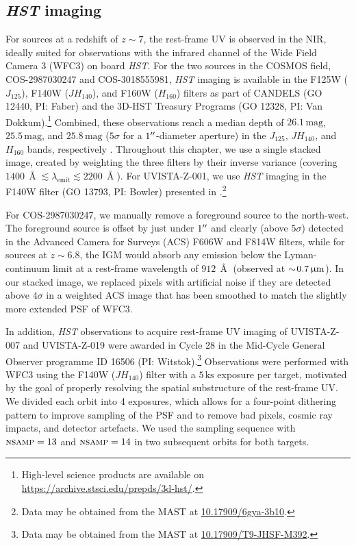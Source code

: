 \subsection{\textit{HST} imaging}
\label{chDssec:Observations:HST}

For sources at a redshift of $z \sim 7$, the rest-frame UV is observed in the NIR, ideally suited for observations with the infrared channel of the Wide Field Camera 3 (WFC3) on board \textit{HST}. For the two sources in the COSMOS field, COS-2987030247 and COS-3018555981, \textit{HST} imaging is available in the F125W ($J_{125}$), F140W ($JH_{140}$), and F160W ($H_{160}$) filters as part of CANDELS (GO 12440, PI: Faber) and the 3D-HST Treasury Programs (GO 12328, PI: Van Dokkum).\footnote{High-level science products are available on \url{https://archive.stsci.edu/prepds/3d-hst/}.} Combined, these observations reach a median depth of $26.1 \, \mathrm{mag}$, $25.5 \, \mathrm{mag}$, and $25.8 \, \mathrm{mag}$ ($5\sigma$ for a $1 \hbox{$^{\prime\prime}$}$-diameter aperture) in the $J_{125}$, $JH_{140}$, and $H_{160}$ bands, respectively \citep{2011ApJS..197...35G, 2011ApJS..197...36K, 2014ApJS..214...24S}. Throughout this chapter, we use a single stacked image, created by weighting the three filters by their inverse variance (covering $1400 \, \Angstrom \lesssim \lambda_\text{emit} \lesssim 2200 \, \Angstrom$). For UVISTA-Z-001, we use \textit{HST} imaging in the F140W filter (GO 13793, PI: Bowler) presented in \citet{2017MNRAS.466.3612B}.\footnote{Data may be obtained from the MAST at \href{https://dx.doi.org/10.17909/6gya-3b10}{10.17909/6gya-3b10}.}

For COS-2987030247, we manually remove a foreground source to the north-west. The foreground source is offset by just under $1 \hbox{$^{\prime\prime}$}$ and clearly (above $5 \sigma$) detected in the Advanced Camera for Surveys (ACS) F606W and F814W filters, while for sources at $z \sim 6.8$, the IGM would absorb any emission below the Lyman-continuum limit at a rest-frame wavelength of $912 \, \Angstrom$ (observed at $\sim \! 0.7 \, \mathrm{\upmu m}$). In our stacked image, we replaced pixels with artificial noise if they are detected above $4 \sigma$ in a weighted ACS image that has been smoothed to match the slightly more extended PSF of WFC3.

In addition, \textit{HST} observations to acquire rest-frame UV imaging of UVISTA-Z-007 and UVISTA-Z-019 were awarded in Cycle 28 in the Mid-Cycle General Observer programme ID 16506 (PI: Witstok).\footnote{Data may be obtained from the MAST at \href{https://dx.doi.org/10.17909/t9-jhsf-m392}{10.17909/T9-JHSF-M392}.} Observations were performed with WFC3 using the F140W ($JH_{140}$) filter with a $5 \, \mathrm{ks}$ exposure per target, motivated by the goal of properly resolving the spatial substructure of the rest-frame UV. We divided each orbit into 4 exposures, which allows for a four-point dithering pattern to improve sampling of the PSF and to remove bad pixels, cosmic ray impacts, and detector artefacts. We used the  sampling sequence with $\textsc{nsamp}=13$ and $\textsc{nsamp}=14$ in two subsequent orbits for both targets.

